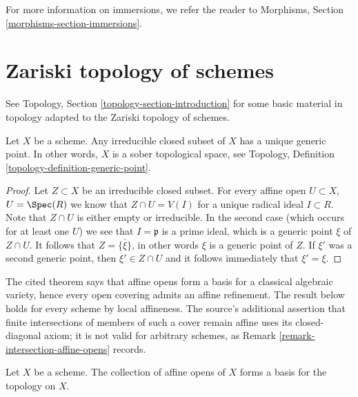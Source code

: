 \medskip\noindent
For more information on immersions, we refer the reader to
Morphisms, Section \ref{morphisms-section-immersions}.










\section{Zariski topology of schemes}
\label{section-topology}

\noindent
See Topology, Section \ref{topology-section-introduction}
for some basic material in topology adapted to the Zariski
topology of schemes.

\begin{lemma}
\label{lemma-scheme-sober}
Let $X$ be a scheme.
Any irreducible closed subset of $X$ has a unique generic point.
In other words, $X$ is a sober topological space, see
Topology, Definition \ref{topology-definition-generic-point}.
\end{lemma}

\begin{proof}
Let $Z \subset X$ be an irreducible closed subset.
For every affine open $U \subset X$, $U = \Spec(R)$
we know that $Z \cap U = V(I)$ for a unique
radical ideal $I \subset R$. Note that $Z \cap U$ is either
empty or irreducible. In the second case (which occurs
for at least one $U$) we see that $I = \mathfrak p$
is a prime ideal, which is a generic point $\xi$ of $Z \cap U$.
It follows that $Z = \overline{\{\xi\}}$, in other words
$\xi$ is a generic point of $Z$. If $\xi'$ was a second
generic point, then $\xi' \in Z \cap U$ and it follows
immediately that $\xi' = \xi$.
\end{proof}

\begin{lemma}
\label{lemma-basis-affine-opens}
\begin{reference}
\cite[Chapter II, \S 3, no. 42, Theorem 1 and Corollary, p. 234]{FAC}
\end{reference}
\begin{history}
The cited theorem says that affine opens form a basis for a classical
algebraic variety, hence every open covering admits an affine refinement.
The result below holds for every scheme by local affineness. The source's
additional assertion that finite intersections of members of such a cover
remain affine uses its closed-diagonal axiom; it is not valid for arbitrary
schemes, as Remark \ref{remark-intersection-affine-opens} records.
\end{history}
Let $X$ be a scheme. The collection of affine opens
of $X$ forms a basis for the topology on $X$.
\end{lemma}


